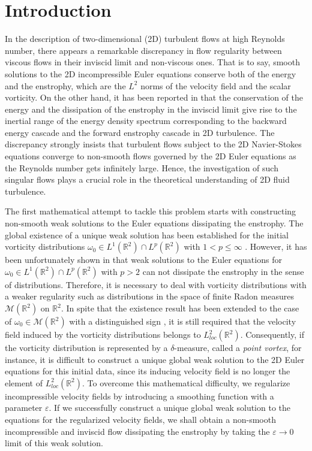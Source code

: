 \documentclass{article}
\theoremstyle{definition}
\begin{document}
\section{Introduction}
In the description of two-dimensional (2D) turbulent flows at high Reynolds number, there appears a remarkable discrepancy in flow regularity between viscous flows 
in their inviscid limit and non-viscous ones. That is to say,  smooth solutions to the 2D incompressible Euler equations conserve both of the energy and the 
enstrophy, which are the $L^2$ norms of the velocity field and the scalar vorticity. On the other hand, it has been reported in \cite{Batchelor, Kraichnan, Leith} 
that the conservation of the energy and the dissipation of the enstrophy  in the inviscid limit give rise to the inertial range of the energy 
density spectrum corresponding to the backward energy cascade and the forward enstrophy cascade in 2D turbulence. The discrepancy strongly insists that turbulent flows
subject to the 2D Navier-Stokes equations converge to non-smooth flows governed by the 2D Euler equations as the Reynolds number gets infinitely large.  Hence,
the investigation of such singular flows plays a crucial role in the theoretical understanding of 2D fluid turbulence.

The first mathematical attempt to tackle this problem starts with constructing non-smooth weak solutions to the Euler equations dissipating the enstrophy. 
The global existence of a unique weak solution has been established for the initial vorticity distributions $\omega_0 \in L^1(\mathbb{R}^2) \cap L^p(\mathbb{R}^2)$ 
with $1<p \leq \infty$ \cite{Diperna, Marchioro, Yudovich}. However, it has been unfortunately shown in \cite{Eyink(a)} that weak solutions to the Euler equations for $\omega_0 \in L^1(\mathbb{R}^2)\cap L^p(\mathbb{R}^2)$ with  $p > 2$ can not dissipate the enstrophy in the sense of distributions. Therefore, it is necessary to deal with  vorticity distributions
with a weaker regularity such as  distributions in  the space of finite Radon measures $\mathcal{M}(\mathbb{R}^2)$ on $\mathbb{R}^2$.  In spite that the existence result has
been extended to the case of  $\omega_0 \in \mathcal{M}(\mathbb{R}^2)$ with a distinguished sign \cite{Delort, Majda}, it is still required that the velocity field induced by the 
vorticity distributions belongs to $L_{loc}^2(\mathbb{R}^2)$.  Consequently, if the vorticity distribution is 
represented by a $\delta$-measure, called a \textit{point vortex},  for instance, it is difficult to construct a unique global weak solution to the 2D Euler equations for this initial data,
  since its inducing velocity field is no longer the element of $L^2_{loc}(\mathbb{R}^2)$.
 To overcome this mathematical difficulty,  we  regularize incompressible velocity fields by introducing a smoothing function with a parameter $\varepsilon$.
 If we successfully construct a unique global weak solution to the equations for the regularized velocity fields, we shall obtain a non-smooth incompressible and inviscid flow dissipating the 
 enstrophy by taking the $\varepsilon \rightarrow 0$ limit of this weak solution.
 
\end{document}
